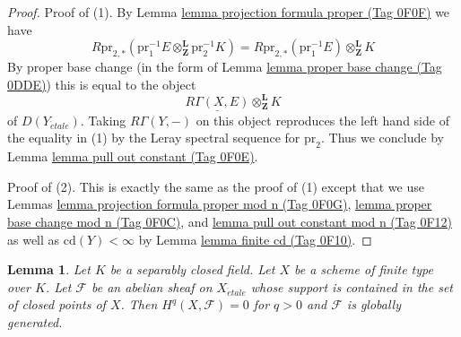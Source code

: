 \documentclass{amsart}
\theoremstyle{plain}
\newtheorem{lemma}[subsection]{Lemma}
\theoremstyle{definition}
\theoremstyle{remark}
\numberwithin{equation}{subsection}
\def\etale{{\acute{e}tale}}
\begin{document}
\begin{proof}
Proof of (1). By Lemma \href{https://stacks.math.columbia.edu/tag/0F0F}{lemma projection formula proper (Tag 0F0F)} we have
$$
R\text{pr}_{2, *}(
\text{pr}_1^{-1}E
\otimes_\mathbf{Z}^\mathbf{L}
\text{pr}_2^{-1}K) =
R\text{pr}_{2, *}(\text{pr}_1^{-1}E)
\otimes_\mathbf{Z}^\mathbf{L}
K
$$
By proper base change (in the form of Lemma \href{https://stacks.math.columbia.edu/tag/0DDE}{lemma proper base change (Tag 0DDE)})
this is equal to the object
$$
\underline{R\Gamma(X, E)}
\otimes_\mathbf{Z}^\mathbf{L}
K
$$
of $D(Y_\etale)$. Taking $R\Gamma(Y, -)$ on this object reproduces the
left hand side of the equality in (1) by the Leray spectral sequence
for $\text{pr}_2$. Thus we conclude by
Lemma \href{https://stacks.math.columbia.edu/tag/0F0E}{lemma pull out constant (Tag 0F0E)}.

\medskip\noindent
Proof of (2). This is exactly the same as the proof of (1)
except that we use Lemmas \href{https://stacks.math.columbia.edu/tag/0F0G}{lemma projection formula proper mod n (Tag 0F0G)},
\href{https://stacks.math.columbia.edu/tag/0F0C}{lemma proper base change mod n (Tag 0F0C)}, and
\href{https://stacks.math.columbia.edu/tag/0F12}{lemma pull out constant mod n (Tag 0F12)} as well as
$\text{cd}(Y) < \infty$ by Lemma \href{https://stacks.math.columbia.edu/tag/0F10}{lemma finite cd (Tag 0F10)}.
\end{proof}


\begin{lemma}
\label{lemma-supported-in-closed-points}
Let $K$ be a separably closed field. Let $X$ be a scheme of finite
type over $K$. Let $\mathcal{F}$ be an abelian sheaf on $X_\etale$
whose support is contained in the set of closed points of $X$.
Then $H^q(X, \mathcal{F}) = 0$ for $q > 0$ and $\mathcal{F}$
is globally generated.
\end{lemma}
\end{document}
